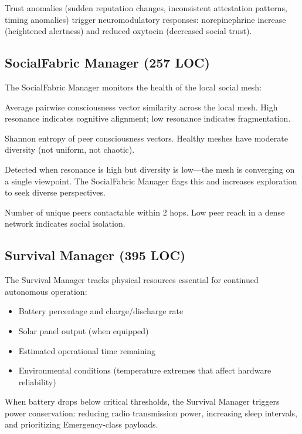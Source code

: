 \documentclass[11pt,twocolumn]{article}
\begin{document}
Trust anomalies (sudden reputation changes, inconsistent attestation
patterns, timing anomalies) trigger neuromodulatory responses:
norepinephrine increase (heightened alertness) and reduced oxytocin
(decreased social trust).

\subsection{SocialFabric Manager (257 LOC)}

The SocialFabric Manager monitors the health of the local social
mesh:

\begin{description}[nosep]
  \item[Resonance mean] Average pairwise consciousness vector similarity
    across the local mesh. High resonance indicates cognitive alignment;
    low resonance indicates fragmentation.
  \item[Diversity] Shannon entropy of peer consciousness vectors.
    Healthy meshes have moderate diversity (not uniform, not chaotic).
  \item[Echo chamber risk] Detected when resonance is high but diversity
    is low---the mesh is converging on a single viewpoint. The
    SocialFabric Manager flags this and increases exploration to seek
    diverse perspectives.
  \item[Peer reach] Number of unique peers contactable within 2 hops.
    Low peer reach in a dense network indicates social isolation.
\end{description}

\subsection{Survival Manager (395 LOC)}

The Survival Manager tracks physical resources essential for continued
autonomous operation:

\begin{itemize}[nosep]
  \item Battery percentage and charge/discharge rate
  \item Solar panel output (when equipped)
  \item Estimated operational time remaining
  \item Environmental conditions (temperature extremes that affect
    hardware reliability)
\end{itemize}

When battery drops below critical thresholds, the Survival Manager
triggers power conservation: reducing radio transmission power,
increasing sleep intervals, and prioritizing Emergency-class payloads.
\end{document}
